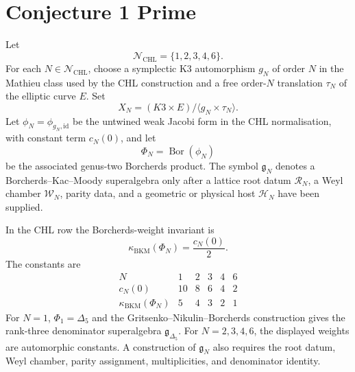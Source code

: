 \providecommand{\kBKM}{\kappa_{\mathrm{BKM}}}
\providecommand{\kch}{\kappa_{\mathrm{ch}}}
\providecommand{\kcat}{\kappa_{\mathrm{cat}}}
\providecommand{\kfib}{\kappa_{\mathrm{fiber}}}
\providecommand{\Mtf}{M_{24}}
\providecommand{\ZZ}{\mathbb{Z}}
\providecommand{\calNCHL}{\mathcal{N}_{\mathrm{CHL}}}
\providecommand{\id}{\mathrm{id}}
\providecommand{\Aut}{\operatorname{Aut}}
\providecommand{\DTred}{Z^{\mathrm{red}}_{\mathrm{DT}}}
\providecommand{\sdim}{\operatorname{sdim}}
\providecommand{\cH}{\mathcal{H}}
\providecommand{\cR}{\mathcal{R}}
\providecommand{\cW}{\mathcal{W}}
\providecommand{\cT}{\mathcal{T}}

\section{Conjecture 1 Prime}
\label{sec:conjecture-one-prime}

Let
\[
  \calNCHL=\{1,2,3,4,6\}.
\]
For each $N\in\calNCHL$, choose a symplectic K3 automorphism
$g_N$ of order $N$ in the Mathieu class used by the CHL construction
and a free order-$N$ translation $\tau_N$ of the elliptic curve $E$.
Set
\[
  X_N=(K3\times E)/\langle g_N\times \tau_N\rangle .
\]
Let $\phi_N=\phi_{g_N,\id}$ be the untwined weak Jacobi form in the
CHL normalisation, with constant term $c_N(0)$, and let
\[
  \Phi_N=\operatorname{Bor}(\phi_N)
\]
be the associated genus-two Borcherds product.  The symbol
$\mathfrak g_N$ denotes a Borcherds--Kac--Moody superalgebra only after
a lattice root datum $\cR_N$, a Weyl chamber $\cW_N$, parity data, and a
geometric or physical host $\cH_N$ have been supplied.

\begin{theorem}
\label{thm:conj-one-prime-chl-weights}
In the CHL row the Borcherds-weight invariant is
\[
  \kBKM(\Phi_N)=\frac{c_N(0)}{2}.
\]
The constants are
\[
\begin{array}{c|ccccc}
N & 1 & 2 & 3 & 4 & 6\\
\hline
c_N(0) & 10 & 8 & 6 & 4 & 2\\
\kBKM(\Phi_N) & 5 & 4 & 3 & 2 & 1
\end{array}
\]
For $N=1$, $\Phi_1=\Delta_5$ and the Gritsenko--Nikulin--Borcherds
construction gives the rank-three denominator superalgebra
$\mathfrak g_{\Delta_5}$.  For $N=2,3,4,6$, the displayed weights are
automorphic constants.  A construction of $\mathfrak g_N$ also requires
the root datum, Weyl chamber, parity assignment, multiplicities, and
denominator identity.
\end{theorem}

